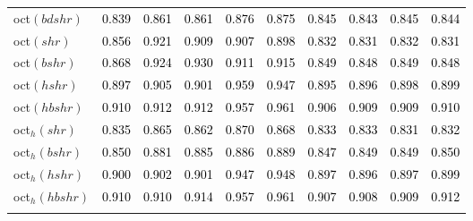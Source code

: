 \begin{tabular}[t]{l|ccccccccc}
oct$(bdshr)$ & \textcolor{black}{0.839} & \textcolor{black}{0.861} & \textcolor{black}{0.861} & \textcolor{black}{0.876} & \textcolor{black}{0.875} & \textcolor{black}{0.845} & \textcolor{black}{0.843} & \textcolor{black}{0.845} & \textcolor{black}{0.844}\\
oct$(shr)$ & \textcolor{black}{0.856} & \textcolor{black}{0.921} & \textcolor{black}{0.909} & \textcolor{black}{0.907} & \textcolor{black}{0.898} & \textcolor{black}{0.832} & \textcolor{black}{0.831} & \textcolor{black}{0.832} & \textcolor{black}{0.831}\\
oct$(bshr)$ & \textcolor{black}{0.868} & \textcolor{black}{0.924} & \textcolor{black}{0.930} & \textcolor{black}{0.911} & \textcolor{black}{0.915} & \textcolor{black}{0.849} & \textcolor{black}{0.848} & \textcolor{black}{0.849} & \textcolor{black}{0.848}\\
oct$(hshr)$ & \textcolor{black}{0.897} & \textcolor{black}{0.905} & \textcolor{black}{0.901} & \textcolor{black}{0.959} & \textcolor{black}{0.947} & \textcolor{black}{0.895} & \textcolor{black}{0.896} & \textcolor{black}{0.898} & \textcolor{black}{0.899}\\
oct$(hbshr)$ & \textcolor{black}{0.910} & \textcolor{black}{0.912} & \textcolor{black}{0.912} & \textcolor{black}{0.957} & \textcolor{black}{0.961} & \textcolor{black}{0.906} & \textcolor{black}{0.909} & \textcolor{black}{0.909} & \textcolor{black}{0.910}\\
oct$_h(shr)$ & \textcolor{black}{0.835} & \textcolor{black}{0.865} & \textcolor{black}{0.862} & \textcolor{black}{0.870} & \textcolor{black}{0.868} & \textcolor{black}{0.833} & \textcolor{black}{0.833} & \textcolor{black}{0.831} & \textcolor{black}{0.832}\\
oct$_h(bshr)$ & \textcolor{black}{0.850} & \textcolor{black}{0.881} & \textcolor{black}{0.885} & \textcolor{black}{0.886} & \textcolor{black}{0.889} & \textcolor{black}{0.847} & \textcolor{black}{0.849} & \textcolor{black}{0.849} & \textcolor{black}{0.850}\\
oct$_h(hshr)$ & \textcolor{black}{0.900} & \textcolor{black}{0.902} & \textcolor{black}{0.901} & \textcolor{black}{0.947} & \textcolor{black}{0.948} & \textcolor{black}{0.897} & \textcolor{black}{0.896} & \textcolor{black}{0.897} & \textcolor{black}{0.899}\\
oct$_h(hbshr)$ & \textcolor{black}{0.910} & \textcolor{black}{0.910} & \textcolor{black}{0.914} & \textcolor{black}{0.957} & \textcolor{black}{0.961} & \textcolor{black}{0.907} & \textcolor{black}{0.908} & \textcolor{black}{0.909} & \textcolor{black}{0.912}\\[-1.5ex]
\hline\\[-1.5ex]
\bottomrule
\end{tabular}
